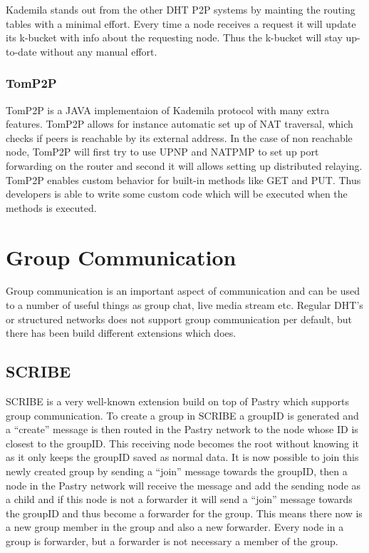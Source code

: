 Kademila stands out from the other DHT P2P systems by mainting the routing tables with a minimal effort. Every time a node receives a request it will update its k-bucket with info about the requesting node. Thus the k-bucket will stay up-to-date without any manual effort.



\subsubsection{TomP2P}
TomP2P is a JAVA implementaion of Kademila protocol with many extra features. TomP2P allows for instance automatic set up of NAT traversal, which checks if peers is reachable by its external address. In the case of non reachable node, TomP2P will first try to use UPNP and NATPMP to set up port forwarding on the router and second it will allows setting up distributed relaying. TomP2P enables custom behavior for built-in methods like GET and PUT. Thus developers is able to write some custom code which will be executed when the methods is executed.



\section{Group Communication}
Group communication is an important aspect of communication and can be used to a number of useful things as group chat, live media stream etc.
Regular DHT's or structured networks does not support group communication per default, but there has been build different extensions which does.
\subsection{SCRIBE}
SCRIBE is a very well-known extension build on top of Pastry which supports group communication. 
To create a group in SCRIBE a groupID is generated and a ``create'' message is then routed in the Pastry network to the node whose ID is closest to the groupID. This receiving node becomes the root without knowing it as it only keeps the groupID saved as normal data.
It is now possible to join this newly created group by sending a ``join'' message towards the groupID, then a node in the Pastry network will receive the message and add the sending node as a child and if this node is not a forwarder it will send a ``join'' message towards the groupID and thus become a forwarder for the group. This means there now is a new group member in the group and also a new forwarder. Every node in a group is forwarder, but a forwarder is not necessary a member of  the group.

